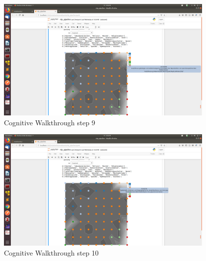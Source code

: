 \begin{figure}[t]
	\centering
	\includegraphics[width=400px]{../chapters/validation/pics/9}
	\caption{\label{pic:step9} Cognitive Walkthrough step 9}
\end{figure}

\begin{figure}[t]
	\centering
	\includegraphics[width=400px]{../chapters/validation/pics/10}
	\caption{\label{pic:step10} Cognitive Walkthrough step 10}
\end{figure} 

